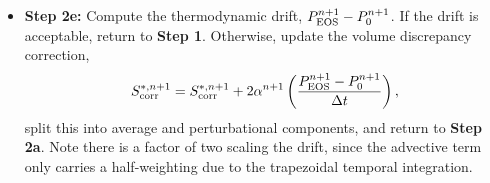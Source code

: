 \documentclass[final]{siamltex}
\def\Fb {{\bf F}}
\def\vb {{\bf v}}
\def\wb {{\bf w}}
\def\Hext {H_{\rm ext}}
\def\half   {\frac{1}{2}}
\begin{document}
\begin{itemize}
\begin{eqnarray}
&&\hspace{-1in} + \half\nabla\cdot\lambda^n\nabla T^n + \half\nabla\cdot\lambda^{n+1,l}\nabla(T^{n+1,l} + \delta T)\nonumber\\
&&\hspace{-1in} + \half\sum_k\nabla\cdot h_k^n \Fb_k^n + \half\sum_k\nabla\cdot h_k^{n+1,l} \Fb_k^{n+1,l}\nonumber\\
&&\hspace{-1in} + \half(\rho\Hext)^n + \half(\rho\Hext)^{n+1},
\end{eqnarray}
\begin{eqnarray}
\left(\frac{\rho^{n+1}c_p^{n+1,l}}{\Delta t} - \nabla\cdot\frac{1}{2}\lambda^{n+1,l}\nabla\right)\delta T &=& \frac{(\rho h)^n - \rho^{n+1}h^{n+1,l}}{\Delta t}\nonumber\\
&&\hspace{-1.25in} + \half\left[-\nabla\cdot(\rho h\vb)^n - \nabla\cdot(\rho h\vb)^{*,n+1} + \frac{\bar{S}^n + \bar{S}_{\rm corr}^n}{\bar{\alpha}^n} + \frac{\bar{S}^{*,n+1} + \bar{S}_{\rm corr}^{*,n+1}}{\bar{\alpha}^{*,n+1}}\right]\nonumber\\
&&\hspace{-1.25in} + \half\nabla\cdot\lambda^n\nabla T^n + \half\nabla\cdot\lambda^{n+1,l}\nabla T^{n+1,l}\nonumber\\
&&\hspace{-1.25in} + \half\sum_k\nabla\cdot h_k^n \Fb_k^n + \half\sum_k\nabla\cdot h_k^{n+1,l} \Fb_k^{n+1,l}\nonumber\\
&&\hspace{-1.25in} + \half(\rho\Hext)^n + \half(\rho\Hext)^{n+1}.
\end{eqnarray}
{\bf Step 2d-3:} Update the temperature and enthalpy using
\begin{equation}
T^{n+1,l+1} = T^{n+1,l} + \delta T, \quad h^{n+1,l+1} = h(\wb^{n+1},T^{n+1,l+1}).
\end{equation}
If $l=l_{\rm max}$, set $(h,T)^{n+1} = (h,T)^{n+1,l+1}$ and proceed to {\bf Step 2e}.\\
\item {\bf Step 2e:} Compute the thermodynamic drift, $P_{\rm EOS}^{n+1} - P_0^{n+1}$.
If the drift is acceptable, return to {\bf Step 1}.  Otherwise,
update the volume discrepancy correction,
\begin{equation}
S_{\rm corr}^{*,n+1} = S_{\rm corr}^{*,n+1} + 2\alpha^{n+1}\left(\frac{P_{\rm EOS}^{n+1} - P_0^{n+1}}{\Delta t}\right),
\end{equation}
split this into average and perturbational components, and return to {\bf Step 2a}.
Note there is a factor of two scaling the drift, since the advective term
only carries a half-weighting due to the trapezoidal temporal integration.\\
\end{itemize}
\end{document}
